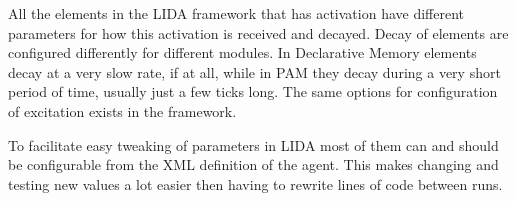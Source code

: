 All the elements in the LIDA framework that has activation have different parameters for how this activation is received and decayed. Decay of elements are configured differently for different modules. In Declarative Memory elements decay at a very slow rate, if at all, while in PAM they decay during a very short period of time, usually just a few ticks long. The same options for configuration of excitation exists in the framework. 

To facilitate easy tweaking of parameters in LIDA most of them can and should be configurable from the XML definition of the agent. This makes changing and testing new values a lot easier then having to rewrite lines of code between runs. 